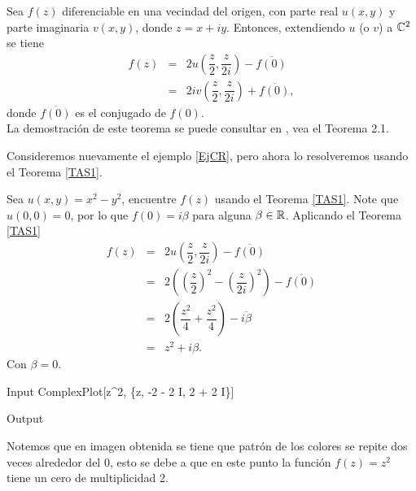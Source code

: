 \begin{teor}\label{TAS1}
	Sea $f(z)$ diferenciable en una vecindad del origen, con parte real $u(x, y)$ y parte imaginaria $v(x, y)$, donde 
	$z = x + iy$. Entonces, extendiendo  $u$ (o $v$) a $\mathbb{C}^2$ se tiene
	\[
		\begin{array}{ccl}
			f(z)&=&2u\left(\dfrac{z}{2},\dfrac{z}{2i}\right)-\overline{f(0)}\\
			&=&2iv\left(\dfrac{z}{2},\dfrac{z}{2i}\right)+\overline{f(0)},
		\end{array}
	\]
	donde $\overline{f(0)}$ es el conjugado de $f(0)$.\\
	La demostración de este teorema se puede consultar en \cite{Shaw-A}, vea el Teorema 2.1.
\end{teor}
Consideremos nuevamente el ejemplo \ref{EjCR}, pero ahora lo resolveremos usando el Teorema \ref{TAS1}.
\begin{Ejem}	
	Sea $u(x,y)=x^2-y^2$, encuentre  $f(z)$ usando el Teorema \ref{TAS1}.
	\solu
	Note que $u(0, 0) = 0$, por lo que $f(0) = i\beta$ para alguna $\beta\in\mathbb{R}$. Aplicando el Teorema \ref{TAS1}
	\[
		\begin{array}{ccl}
			f(z)&=&2u\left(\dfrac{z}{2},\dfrac{z}{2i}\right)-\overline{f(0)}\\
			&=&2\left(\left(\dfrac{z}{2}\right)^2-\left(\dfrac{z}{2i}\right)^2\right)-\overline{f(0)}\\
			&=&2\left(\dfrac{z^2}{4}+\dfrac{z^2}{4}\right)-\overline{i\beta}\\
			&=&z^2+i\beta.
		\end{array}
	\]
	Con  $\beta=0$. 
	\begin{mmaCell}{Input}
		ComplexPlot[z^2, \{z, -2 - 2 I, 2 + 2 I\}]
	\end{mmaCell}
	
	\begin{mmaCell}[moregraphics={moreig={scale=.25}}]{Output}
	\end{mmaCell}
 Notemos que en imagen obtenida se tiene que patrón de los colores se repite dos veces alrededor del $0$, esto se debe a que en este punto la función $f(z)=z^2$ tiene un cero de multiplicidad 2.\endproof
\end{Ejem}

